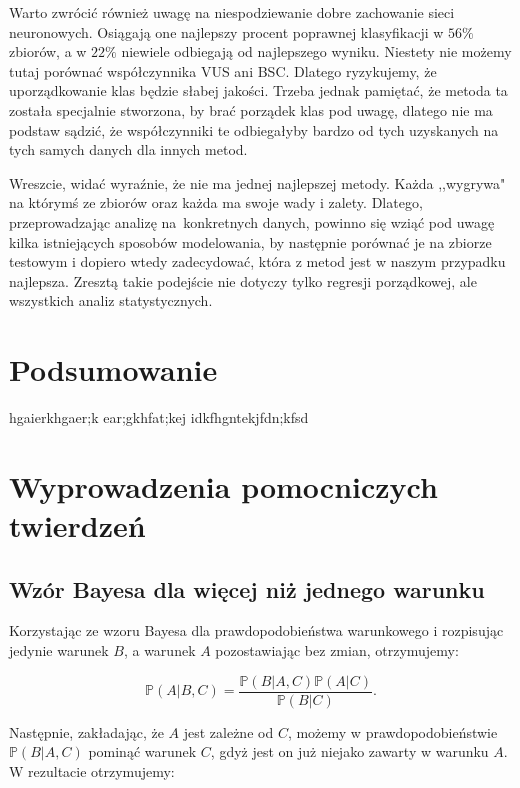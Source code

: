 \documentclass{mini}
\begin{document}
Warto zwrócić również uwagę na niespodziewanie dobre zachowanie sieci neuronowych. Osiągają one najlepszy procent poprawnej klasyfikacji w $56\%$ zbiorów, a w $22\%$ niewiele odbiegają od najlepszego wyniku. Niestety nie możemy tutaj porównać współczynnika VUS ani BSC. Dlatego ryzykujemy, że uporządkowanie klas będzie słabej jakości. Trzeba jednak pamiętać, że metoda ta została specjalnie stworzona, by brać porządek klas pod uwagę, dlatego nie ma podstaw sądzić, że współczynniki te odbiegałyby bardzo od tych uzyskanych na tych samych danych dla innych metod. 

Wreszcie, widać wyraźnie, że nie ma jednej najlepszej metody. Każda ,,wygrywa" na którymś ze zbiorów oraz każda ma swoje wady i zalety. Dlatego, przeprowadzając analizę na~konkretnych danych, powinno się wziąć pod uwagę kilka istniejących sposobów modelowania, by następnie porównać je na zbiorze testowym i dopiero wtedy zadecydować, która z metod jest w naszym przypadku najlepsza. Zresztą takie podejście nie dotyczy tylko regresji porządkowej, ale wszystkich analiz statystycznych.




\chapter*{Podsumowanie}

hgaierkhgaer;k
ear;gkhfat;kej
idkfhgntekjfdn;kfsd

\appendix

\chapter{Wyprowadzenia pomocniczych twierdzeń}

\section{Wzór Bayesa dla więcej niż jednego warunku}\label{app1}

Korzystając ze wzoru Bayesa dla prawdopodobieństwa warunkowego i rozpisując jedynie warunek $B$, a warunek $A$ pozostawiając bez zmian, otrzymujemy:

$$
\mathbb{P}(A | B, C) 
=
\frac{
\mathbb{P}(B | A, C)
\mathbb{P}(A | C)
}{
\mathbb{P}(B | C)
}. 
$$

Następnie, zakładając, że $A$ jest zależne od $C$, możemy w prawdopodobieństwie $\mathbb{P}(B | A, C)$ pominąć warunek $C$, gdyż jest on już niejako zawarty w warunku $A$. W rezultacie otrzymujemy:
\end{document}
